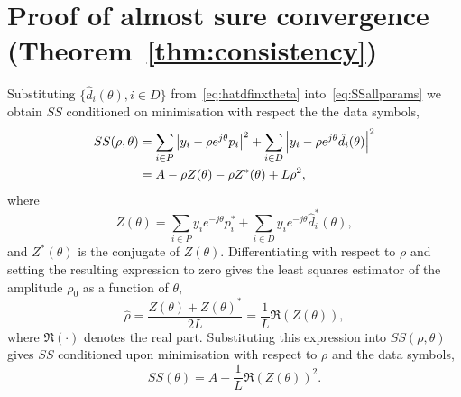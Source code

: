\documentclass[journal]{IEEEtran}
\begin{document}
\section{Proof of almost sure convergence (Theorem~\ref{thm:consistency}) } \label{sec:proof-almost-sure}

Substituting $\{ \hat{d}_i(\theta), i \in D \}$ from~\eqref{eq:hatdfinxtheta} into~\eqref{eq:SSallparams} we obtain $SS$ conditioned on minimisation with respect the the data symbols,
 \begin{align*}
SS(\rho, \theta) &=\sum_{i \in P} {\left\vert  y_i - \rho e^{j\theta} p_i  \right\vert}^2 + \sum_{i \in D} {\left\vert  y_i - \rho e^{j\theta} \hat{d_i}(\theta)  \right\vert}^2 \\
&= A - \rho Z(\theta) - \rho Z^*(\theta) + L \rho^2,
\end{align*}
where
\[
Z(\theta)  = \sum_{i \in P} y_i e^{-j\theta} p_i^* + \sum_{i \in D} y_i e^{-j\theta} \hat{d}_i^*(\theta),
\]
and $Z^*(\theta)$ is the conjugate of $Z(\theta)$.  Differentiating with respect to $\rho$ and setting the resulting expression to zero gives the least squares estimator of the amplitude $\rho_0$ as a function of $\theta$, 
\begin{equation}\label{eq:hatrhoZ}
\hat{\rho} = \frac{Z(\theta) + Z(\theta)^*}{2L} = \frac{1}{L}\Re(Z(\theta)),
\end{equation}
where $\Re(\cdot)$ denotes the real part.  Substituting this expression into $SS(\rho, \theta)$ gives $SS$ conditioned upon minimisation with respect to $\rho$ and the data symbols,
\[
SS(\theta) = A - \frac{1}{L}\Re(Z(\theta))^2.
\]
\end{document}

